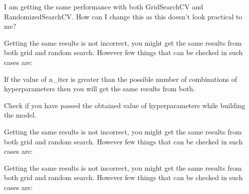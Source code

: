 	\begin{qanda}
		\begin{question}
I am getting the same performance with both GridSearchCV and RandomizedSearchCV.  How can I change this as this doesn't look practical to me?
		\end{question}

		\begin{answer}
Getting the same results is not incorrect, you might get the same results from both grid and random search.  However few things that can be checked in such cases are:
	\begin{bulletedlist}
		\item If the value of n\_iter is greater than the possible number of combinations of hyperparameters then you will get the same results from both.
		\item Check if you have passed the obtained value of hyperparameters while building the model.
	\end{bulletedlist}

Getting the same results is not incorrect, you might get the same results from both grid and random search.  However few things that can be checked in such cases are:

Getting the same results is not incorrect, you might get the same results from both grid and random search.  However few things that can be checked in such cases are:
		\end{answer}
	\end{qanda}